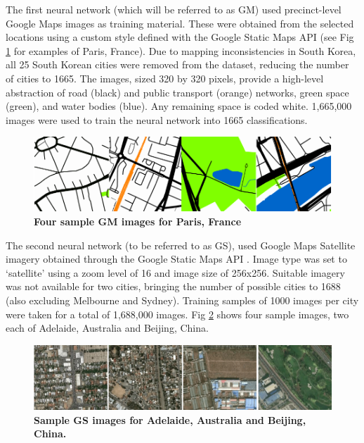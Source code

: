 \documentclass[10pt,letterpaper]{article}
\begin{document}
The first neural network (which will be referred to as GM) used precinct-level Google Maps images as training material. These were obtained from the selected locations using a custom style defined with the Google Static Maps API \cite{GoogleStatic2017} (see Fig \ref{fig:maps} for examples of Paris, France). Due to mapping inconsistencies in South Korea, all 25 South Korean cities were removed from the dataset, reducing the number of cities to 1665. The images, sized 320 by 320 pixels, provide a high-level abstraction of road (black) and public transport (orange) networks, green space (green), and water bodies (blue). Any remaining space is coded white. 1,665,000 images were used to train the neural network into 1665 classifications.

\begin{figure}[!htbp]
    \centering    
\includegraphics[scale=1]{Images/PlosOne/Fig2.png}  

\caption{\bf Four sample GM images for Paris, France \cite{GoogleStatic2017}}    
 \label{fig:maps}  
\end{figure} 

The second neural network (to be referred to as GS), used Google Maps Satellite imagery obtained through the Google Static Maps API \cite{GoogleStatic2017}. Image type was set to `satellite' using a zoom level of 16 and image size of 256x256. Suitable imagery was not available for two cities, bringing the number of possible cities to 1688 (also excluding Melbourne and Sydney). Training samples of 1000 images per city were taken for a total of 1,688,000 images. Fig \ref{fig:satbeiade} shows four sample images, two each of Adelaide, Australia and Beijing, China. 


\begin{figure}[!htbp]
    \centering 
    \includegraphics[scale=1]{Images/PlosOne/Fig3.png}     
\caption{\bf Sample GS images for Adelaide, Australia and Beijing, China. \cite{GoogleStatic2017}}    
 \label{fig:satbeiade}  
\end{figure} 
\end{document}
